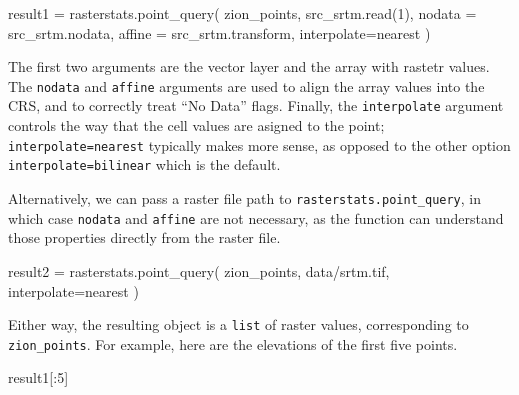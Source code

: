 \documentclass[
  letterpaper,
]{krantz}
\newenvironment{Shaded}{\begin{snugshade}}{\end{snugshade}}
\newcommand{\DecValTok}[1]{\textcolor[rgb]{0.68,0.00,0.00}{#1}}
\newcommand{\NormalTok}[1]{\textcolor[rgb]{0.00,0.23,0.31}{#1}}
\newcommand{\OperatorTok}[1]{\textcolor[rgb]{0.37,0.37,0.37}{#1}}
\newcommand{\StringTok}[1]{\textcolor[rgb]{0.13,0.47,0.30}{#1}}
\begin{document}
\begin{Shaded}
\begin{Highlighting}[]
\NormalTok{result1 }\OperatorTok{=}\NormalTok{ rasterstats.point\_query(}
\NormalTok{    zion\_points, }
\NormalTok{    src\_srtm.read(}\DecValTok{1}\NormalTok{), }
\NormalTok{    nodata }\OperatorTok{=}\NormalTok{ src\_srtm.nodata, }
\NormalTok{    affine }\OperatorTok{=}\NormalTok{ src\_srtm.transform,}
\NormalTok{    interpolate}\OperatorTok{=}\StringTok{\textquotesingle{}nearest\textquotesingle{}}
\NormalTok{)}
\end{Highlighting}
\end{Shaded}

The first two arguments are the vector layer and the array with rastetr
values. The \texttt{nodata} and \texttt{affine} arguments are used to
align the array values into the CRS, and to correctly treat ``No Data''
flags. Finally, the \texttt{interpolate} argument controls the way that
the cell values are asigned to the point;
\texttt{interpolate=\textquotesingle{}nearest\textquotesingle{}}
typically makes more sense, as opposed to the other option
\texttt{interpolate=\textquotesingle{}bilinear\textquotesingle{}} which
is the default.

Alternatively, we can pass a raster file path to
\texttt{rasterstats.point\_query}, in which case \texttt{nodata} and
\texttt{affine} are not necessary, as the function can understand those
properties directly from the raster file.

\begin{Shaded}
\begin{Highlighting}[]
\NormalTok{result2 }\OperatorTok{=}\NormalTok{ rasterstats.point\_query(}
\NormalTok{    zion\_points, }
    \StringTok{\textquotesingle{}data/srtm.tif\textquotesingle{}}\NormalTok{,}
\NormalTok{    interpolate}\OperatorTok{=}\StringTok{\textquotesingle{}nearest\textquotesingle{}}
\NormalTok{)}
\end{Highlighting}
\end{Shaded}

Either way, the resulting object is a \texttt{list} of raster values,
corresponding to \texttt{zion\_points}. For example, here are the
elevations of the first five points.

\begin{Shaded}
\begin{Highlighting}[]
\NormalTok{result1[:}\DecValTok{5}\NormalTok{]}
\end{Highlighting}
\end{Shaded}
\end{document}
